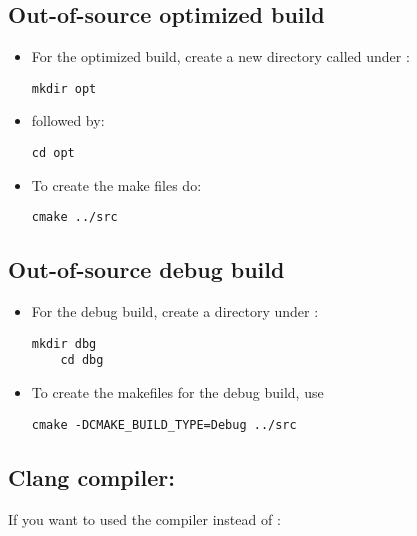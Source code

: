 \documentclass[11pt,fleqn]{book} %
\begin{document}
\subsection{ Out-of-source optimized build}
\begin{itemize}
  \item For the optimized build, create a new directory called  under :

\begin{lstlisting}[backgroundcolor=\color{background}]
    mkdir opt
\end{lstlisting}

  \item followed by:

\begin{lstlisting}[backgroundcolor=\color{background}]
    cd opt
\end{lstlisting}

  \item To create the make files do:

\begin{lstlisting}[backgroundcolor=\color{background}]
    cmake ../src
\end{lstlisting}
\end{itemize}

\subsection{ Out-of-source debug build}
\begin{itemize}
 \item For the debug build, create a directory  under :

\begin{lstlisting}[backgroundcolor=\color{background}]
    mkdir dbg
    cd dbg
\end{lstlisting}

 \item To create the makefiles for the debug build, use

\begin{lstlisting}[backgroundcolor=\color{background}]
    cmake -DCMAKE_BUILD_TYPE=Debug ../src
\end{lstlisting}

\end{itemize}

\subsection{ Clang compiler:}
If you want to used the  compiler instead of :
\end{document}
